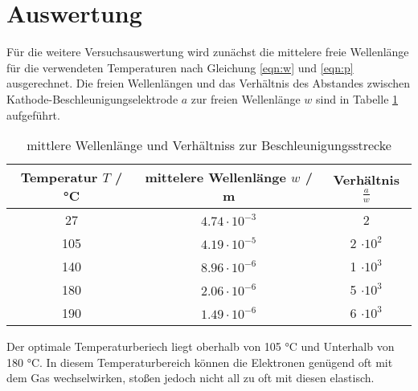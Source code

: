 \section{Auswertung}
\label{sec:Auswertung}
Für die weitere Versuchsauswertung wird zunächst die mittelere freie Wellenlänge für die verwendeten Temperaturen nach Gleichung \ref{eqn:w} und \ref{eqn:p} ausgerechnet. Die freien Wellenlängen und das Verhältnis des Abstandes zwischen Kathode-Beschleunigungselektrode $a$ zur freien Wellenlänge $w$ sind in Tabelle \ref{tab:mitWel} aufgeführt.
\begin{table}
  \centering
  \begin{tabular}{c c c}
    \toprule
    	Temperatur $T$ / °C & mittelere Wellenlänge $w$ / m & Verhältnis $\frac{a}{w}$ \\
    \midrule
    	27  & $4.74 \cdot 10^{-3}$	& 2			\\
      	105 & $4.19 \cdot 10^{-5}$	& 2 $\cdot 10^2$	\\
	140 & $8.96 \cdot 10^{-6}$	& 1 $\cdot 10^3$	\\
	180 & $2.06 \cdot 10^{-6}$	& 5 $\cdot 10^3$	\\
	190 & $1.49 \cdot 10^{-6}$	& 6 $\cdot 10^3$	\\
	\bottomrule
  \end{tabular}
  \caption{mittlere Wellenlänge und Verhältniss zur Beschleunigungsstrecke}
  \label{tab:mitWel}
\end{table}
Der optimale Temperaturberiech liegt oberhalb von 105 °C und Unterhalb von 180 °C. In diesem Temperaturbereich können die Elektronen genügend oft mit dem Gas wechselwirken, stoßen jedoch nicht all zu oft mit diesen elastisch.

